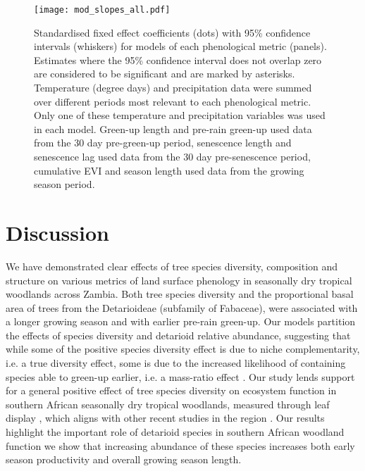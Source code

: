 \documentclass[11pt,a4paper]{article}
\begin{document}
\begin{figure}[H]
\centering
	\texttt{[image: mod\_slopes\_all.pdf]}
	\caption{Standardised fixed effect coefficients (dots) with 95\% confidence
		intervals (whiskers) for models of each phenological metric (panels).
		Estimates where the 95\% confidence interval does not overlap zero are
		considered to be significant and are marked by asterisks. Temperature
		(degree days) and precipitation data were summed over different periods
		most relevant to each phenological metric. Only one of these
		temperature and precipitation variables was used in each model.
		Green-up length and pre-rain green-up used data from the 30 day
		pre-green-up period, senescence length and senescence lag used data
		from the 30 day pre-senescence period, cumulative EVI and season length
		used data from the growing season period.}
	\label{mod_slopes}
\end{figure}

\section{Discussion}

We have demonstrated clear effects of tree species diversity, composition and
structure on various metrics of land surface phenology in seasonally dry
tropical woodlands across Zambia. Both tree species diversity and the
proportional basal area of trees from the Detarioideae (subfamily of Fabaceae),
were associated with a longer growing season and with earlier pre-rain
green-up. Our models partition the effects of species diversity and detarioid
relative abundance, suggesting that while some of the positive species
diversity effect is due to niche complementarity, i.e. a true diversity effect,
some is due to the increased likelihood of containing species able to green-up
earlier, i.e. a mass-ratio effect \citep{Grime1998, Tilman2014}. Our study
lends support for a general positive effect of tree species diversity on
ecosystem function in southern African seasonally dry tropical woodlands,
measured through leaf display \citep{Richardson2009}, which aligns with other
recent studies in the region \citep{Godlee2021, McNicol2018, Shirima2015}. Our
results highlight the important role of detarioid species in southern African
woodland function we show that increasing abundance of these species
increases both early season productivity and overall growing season length.
\end{document}
